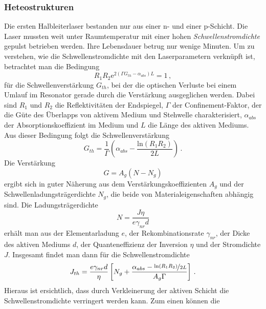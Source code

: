 \subsubsection{Heteostrukturen}\label{heterostrukturen}
Die ersten Halbleiterlaser bestanden nur aus einer n- und einer
p-Schicht. Die Laser mussten weit unter Raumtemperatur mit einer hohen
\textit{Schwellenstromdichte} gepulst betrieben werden. Ihre Lebensdauer betrug
nur wenige Minuten. Um zu verstehen, wie die Schwellenstromdichte mit den
Laserparametern verknüpft ist, betrachtet man die Bedingung
\begin{equation}\label{eq:schwellenbedingung}
	R_1R_2\mathrm{e}^{2\left(\Gamma G_{th}-\alpha_{abs}\right)L}=1\,,
\end{equation}
für die Schwellenverstärkung $G_{th}$, bei der die optischen Verluste bei einem
Umlauf im Resonator gerade durch die Verstärkung ausgeglichen werden.
Dabei sind $R_1$ und $R_2$ die Reflektivitäten der Endspiegel, $\Gamma$ der
Confinement-Faktor, der die Güte des Überlapps von aktivem Medium und
Stehwelle charakterisiert, $\alpha_{abs}$ der Absorptionskoeffizient im
Medium und $L$ die Länge des aktiven Mediums. Aus dieser Bedingung folgt die
Schwellenverstärkung
\begin{equation}\label{eq:schwellenverstärkung}
	G_{th}=\frac{1}{\Gamma}\left(\alpha_{abs}-\frac{\mathrm{ln}{(R_1R_2)}}{2L}\right)\,.
\end{equation}
Die Verstärkung
\begin{equation}\label{eq:laser-verstärkung}
	G=A_g\left(N-N_g\right)
\end{equation}
ergibt sich in guter Näherung aus dem Verstärkungskoeffizienten $A_g$ und der
Schwellenladungsträgerdichte $N_g$, die beide von Materialeigenschaften abhängig
sind. Die Ladungsträgerdichte
\begin{equation}\label{eq:ladungstraegerdichte}
	N=\frac{J\eta}{e\gamma_{nr}d}
\end{equation}
erhält man aus der Elementarladung $e$, der Rekombinationsrate $\gamma_{nr}$,
der Dicke des aktiven Mediums $d$, der Quanteneffizienz der Inversion $\eta$ und der
Stromdichte $J$. Insgesamt findet man dann für die Schwellenstromdichte
\begin{equation}\label{eq:schwellenstromdichte}
	J_{th}=\frac{e\gamma_{nr}d}{\eta}\left[N_g+\frac{\alpha_{abs}-\nicefrac{\mathrm{ln}{\left(R_1R_2\right)}}{2L}}{A_g\Gamma}\right]\,.
\end{equation}
Hieraus ist ersichtlich, dass durch Verkleinerung der aktiven Schicht die
Schwellenstromdichte verringert werden kann. Zum einen können die
